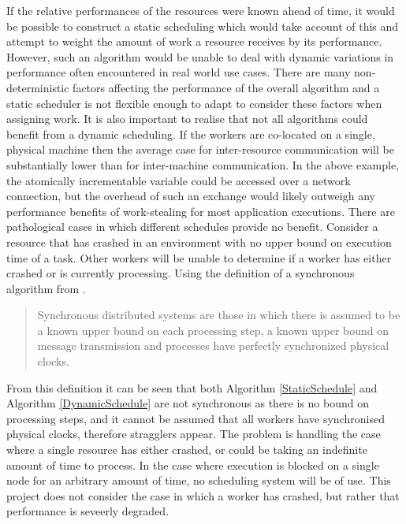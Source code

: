 \documentclass[12pt]{article}
\begin{document}
If the relative performances of the resources were known ahead of time, it would be possible to construct a static scheduling which would take account of this and attempt to weight the amount of work a resource receives by its performance. However, such an algorithm would be unable to deal with dynamic variations in performance often encountered in real world use cases. There are many non-deterministic factors affecting the performance of the overall algorithm and a static scheduler is not flexible enough to adapt to consider these factors when assigning work.
\newline
\newline
It is also important to realise that not all algorithms could benefit from a dynamic scheduling. If the workers are co-located on a single, physical machine then the average case for inter-resource communication will be substantially lower than for inter-machine communication. In the above example, the atomically incrementable variable could be accessed over a network connection, but the overhead of such an exchange would likely outweigh any performance benefits of work-stealing for most application executions.
\newline
\newline
There are pathological cases in which different schedules provide no benefit. Consider a resource that has crashed in an environment with no upper bound on execution time of a task. Other workers will be unable to determine if a worker has either crashed or is currently processing.
\newline
Using the definition of a synchronous algorithm from \cite{mageeanalyzing}.

\blockquote{Synchronous distributed systems are those in which there is assumed
to be a known upper bound on each processing step, a known upper bound on
message transmission and processes have perfectly synchronized physical
clocks.}

From this definition it can be seen that both Algorithm \ref{StaticSchedule} and Algorithm \ref{DynamicSchedule} are not synchronous as there is no bound on processing steps, and it cannot be assumed that all workers have synchronised physical clocks, therefore stragglers appear. The problem is handling the case where a single resource has either crashed, or could be taking an indefinite amount of time to process. In the case where execution is blocked on a single node for an arbitrary amount of time, no scheduling system will be of use. This project does not consider the case in which a worker has crashed, but rather that performance is seveerly degraded.
\end{document}

